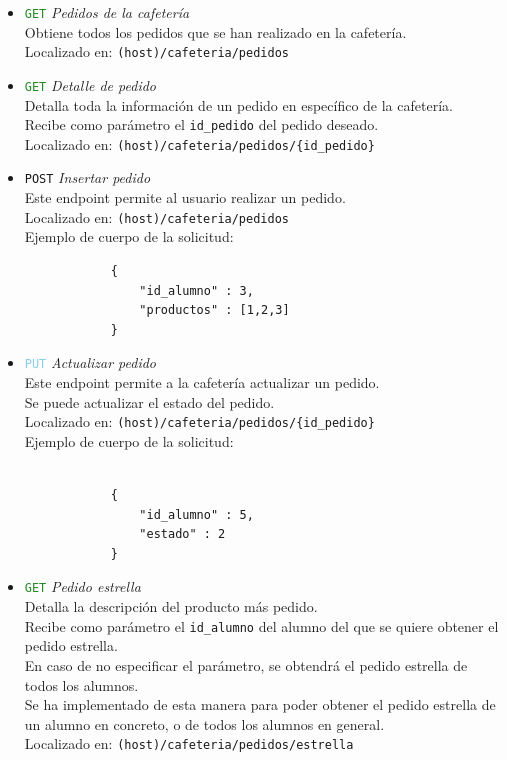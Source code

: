 \documentclass[12pt]{report}
\begin{document}
\begin{itemize}
\begin{itemize}
\begin{itemize}
            \item \textcolor{ForestGreen}{\texttt{GET}} \textit{Pedidos de la cafetería}\\
            Obtiene todos los pedidos que se han realizado en la cafetería.\\
            Localizado en: \texttt{(host)/cafeteria/pedidos}
            \item \textcolor{ForestGreen}{\texttt{GET}} \textit{Detalle de pedido}\\
            Detalla toda la información de un pedido en específico de la cafetería.\\
            Recibe como parámetro el \texttt{id\_pedido} del pedido deseado.\\
            Localizado en: \texttt{(host)/cafeteria/pedidos/\{id\_pedido\}}
            \item \textcolor{YellowOrange}{\texttt{POST}} \textit{Insertar pedido}\\
            Este endpoint permite al usuario realizar un pedido.\\
            Localizado en: \texttt{(host)/cafeteria/pedidos}
            \\Ejemplo de cuerpo de la solicitud:
            \begin{verbatim}
            {
                "id_alumno" : 3,
                "productos" : [1,2,3]
            }
            \end{verbatim}

            \item \textcolor{SkyBlue}{\texttt{PUT}} \textit{Actualizar pedido}\\
            Este endpoint permite a la cafetería actualizar un pedido.\\
            Se puede actualizar el estado del pedido.\\
            Localizado en: \texttt{(host)/cafeteria/pedidos/\{id\_pedido\}}
            \\Ejemplo de cuerpo de la solicitud:
            \begin{verbatim}
            
            {
                "id_alumno" : 5,
                "estado" : 2
            }
            \end{verbatim}
            \item \textcolor{ForestGreen}{\texttt{GET}} \textit{Pedido estrella}\\
            Detalla la descripción del producto más pedido.\\
            Recibe como parámetro el \texttt{id\_alumno} del alumno del que se quiere obtener el pedido estrella.\\
            En caso de no especificar el parámetro, se obtendrá el pedido estrella de todos los alumnos.\\
            Se ha implementado de esta manera para poder obtener el pedido estrella de un alumno en concreto, o de todos los alumnos en general.\\
            Localizado en: \texttt{(host)/cafeteria/pedidos/estrella}


\end{itemize}
\end{itemize}
\end{itemize}
\end{document}
